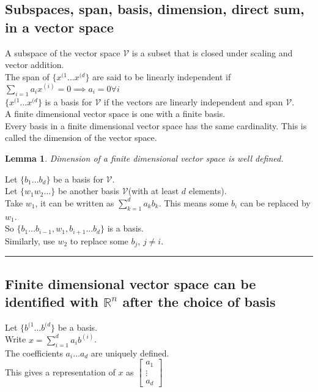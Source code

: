 \documentclass[twoside]{article}
\newtheorem{lemma}[theorem]{Lemma}
\newenvironment{proof}{{\bf Proof:}}{\hfill\rule{2mm}{2mm}}
\begin{document}
\subsection{Subspaces, span, basis, dimension, direct sum, in a vector space}
A subspace of the vector space $\mathcal{V}$ is a subset that is closed under scaling and vector addition.\\
The span of $\{x^{(1}\hdots x^{(d}\}$ are said to be linearly independent if $\sum_{i=1}a_ix^{(i)}=0 \implies a_i=0 \forall i$\\
$\{x^{(1}\hdots x^{(d}\}$ is a basis for $\mathcal{V}$ if the vectors are linearly independent and span $\mathcal{V}$.\\
A finite dimensional vector space is one with a finite basis.\\
Every basis in a finite dimensional vector space has the same cardinality. This is called the dimension of the vector space.

\begin{lemma}
Dimension of a finite dimensional vector space is well defined.
\end{lemma}

\begin{proof}
Let $\{b_1\hdots b_d\}$ be a basis for $\mathcal{V}$.\\
Let $\{w_1 w_2 \hdots \}$ be another basis $\mathcal{V}$(with at least $d$ elements).\\
Take $w_1$, it can be written as $\sum_{k=1}^d a_k b_k$. This means some $b_i$ can be replaced by $w_1$.\\
So $\{b_1\hdots b_{i-1}, w_1, b_{i+1}\hdots b_d\}$ is a basis.\\
Similarly, use $w_2$ to replace some $b_j$, $j \neq i$.
\end{proof}


\subsection{Finite dimensional vector space can be identified with $\mathbb{R}^n$ after the choice of basis}
Let $\{b^{(1}\hdots b^{(d}\}$ be a basis.\\
Write $x=\sum_{i=1}^{d}a_ib^{(i)} $.\\
The coefficients $a_i \hdots a_d$ are uniquely defined.\\
This gives a representation of $x$ as $\begin{bmatrix}
a_1\\
\vdots \\
a_d
\end{bmatrix}$
\end{document}
